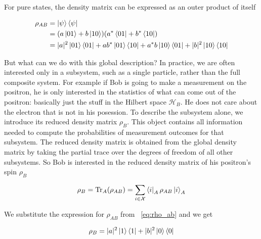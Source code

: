 \documentclass[11pt,a4paper]{article}
\begin{document}
For pure states, the density matrix can be expressed as an outer product of itself

\begin{align}
\rho_{AB}
&= \ket{\psi}\bra{\psi} \\
&= (a\ket{01} + b\ket{10})
   (a^*\bra{01} + b^*\bra{10}) \\
&= |a|^2 \ket{01}\bra{01}
 + ab^* \ket{01}\bra{10}
 + a^*b \ket{10}\bra{01}
 + |b|^2 \ket{10}\bra{10}
\label{eq:rho_ab}
\end{align}

But what can we do with this global description? In practice, we are often interested only in a
subsystem, such as a single particle, rather than the full composite system. For example if Bob
is going to make a measurement on the positron, he is only interested in the statistics of what
can come out of the positron: basically just the stuff in the Hilbert space $\mathcal{H}_B$.
He does not care about the electron that is not in his posession.
To describe the subsystem alone, we introduce its reduced density matrix $\rho_{B}$. This object contains
all information needed to compute the probabilities of measurement outcomes for that subsystem.
The reduced density matrix is obtained from the global density matrix by taking the
partial trace over the degrees of freedom of all other subsystems. So Bob is interested
in the reduced density matrix of his positron's spin $\rho_{B}$

\begin{equation}
    \rho_{B} = \mathrm{Tr}_{A}(\rho_{AB}) = \sum_{i \in \mathcal{X}} \bra{i}_A\rho_{AB}\ket{i}_A
\end{equation}

We substitute the expression for $\rho_{AB}$ from ~\eqref{eq:rho_ab} and we get

\begin{equation}
    \rho_{B} = |a|^2 \ket{1}\bra{1} + |b|^2 \ket{0}\bra{0}
\label{eq:rho_b}
\end{equation}
\end{document}
